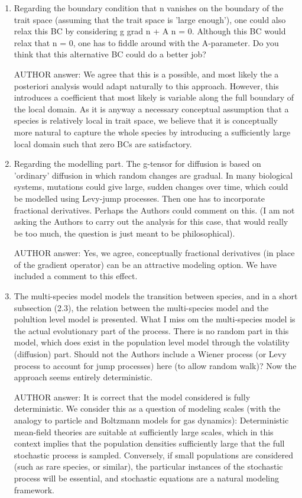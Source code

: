 \documentclass[a4paper,11pt]{scrartcl}
\begin{document}
\begin{enumerate}
\item
Regarding the boundary condition that n vanishes on the boundary of the trait space (assuming that the trait space is 'large enough'), one could also relax this BC by considering g grad n + A n = 0. Although this BC would relax that n = 0, one has to fiddle around with the A-parameter. Do you think that this alternative BC could do a better job?

AUTHOR answer: 
We agree that this is a possible, and most likely the a posteriori analysis would adapt naturally to this approach. However, this introduces a coefficient that most likely is variable along the full boundary of the local domain. As it is anyway a necessary conceptual assumption that a species is relatively local in trait space, we believe that it is conceptually more natural to capture the whole species by introducing a sufficiently large local domain such that zero BCs are satisfactory. 

\item
Regarding the modelling part. The g-tensor for diffusion is based on 'ordinary' diffusion in which random changes are gradual. In many biological systems, mutations could give large, sudden changes over time, which could be modelled using Levy-jump processes. Then one has to incorporate fractional derivatives. Perhaps the Authors could comment on this. (I am not asking the Authors to carry out the analysis for this case, that would really be too much, the question is just meant to be philosophical).

AUTHOR answer: Yes, we agree, conceptually fractional derivatives (in place of the gradient operator) can be an attractive modeling option. We have included a comment to this effect. 

\item
The multi-species model models the transition between species, and in a short subsection (2.3), the relation between the multi-species model and the polultion level model is presented. What I miss om the multi-species model is the actual evolutionary part of the process. There is no random part in this model, which does exist in the population level model through the volatility (diffusion) part. Should not the Authors include a Wiener process (or Levy process to account for jump processes) here (to allow random walk)? Now the approach seems entirely deterministic.

AUTHOR answer: It is correct that the model considered is fully deterministic. We consider this as a question of modeling scales (with the analogy to particle and Boltzmann models for gas dynamics): Deterministic mean-field theories are suitable at sufficiently large scales, which in this context implies that the population densities sufficiently large that the full stochastic process is sampled. Conversely, if small populations are considered (such as rare species, or similar), the particular instances of the stochastic process will be essential, and stochastic equations are a natural modeling framework. 



\end{enumerate}
\end{document}
